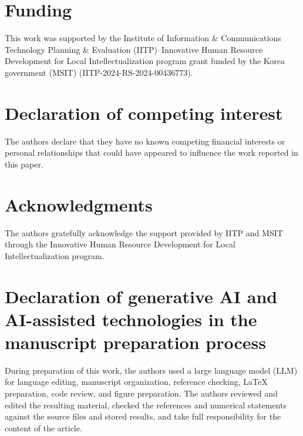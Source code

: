 \documentclass[preprint,12pt]{elsarticle}
\begin{document}
\section*{Funding}

This work was supported by the Institute of Information \& Communications
Technology Planning \& Evaluation (IITP)--Innovative Human Resource Development
for Local Intellectualization program grant funded by the Korea government
(MSIT) (IITP-2024-RS-2024-00436773).

\section*{Declaration of competing interest}

The authors declare that they have no known competing financial interests or
personal relationships that could have appeared to influence the work reported
in this paper.

\section*{Acknowledgments}

The authors gratefully acknowledge the support provided by IITP and MSIT
through the Innovative Human Resource Development for Local Intellectualization
program.

\section*{Declaration of generative AI and AI-assisted technologies in the
manuscript preparation process}

During preparation of this work, the authors used a large language model (LLM)
for language editing, manuscript organization, reference checking, LaTeX
preparation, code review, and figure preparation. The authors reviewed and
edited the resulting material, checked the references and numerical statements
against the source files and stored results, and take full responsibility for
the content of the article.
\end{document}

